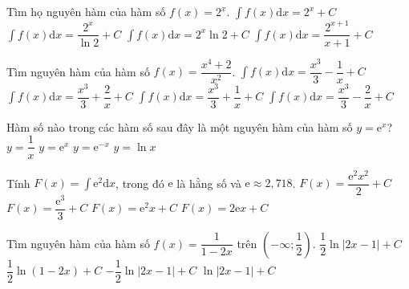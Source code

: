 \begin{ex}
	Tìm họ nguyên hàm của hàm số $ f(x)=2^x$.
	\choice
	{$\displaystyle\int{f(x)}\mathrm{d}x=2^x+C$}
	{\True $\displaystyle\int{f(x)}\mathrm{d}x=\dfrac{2^x}{\ln 2}+C$}
	{$\displaystyle\int{f(x)}\mathrm{d}x=2^x\ln 2+C$}
	{$\displaystyle\int{f(x)}\mathrm{d}x=\dfrac{2^{x+1}}{x+1}+C$}
\end{ex}
\begin{ex}
	Tìm nguyên hàm của hàm số $ f(x)=\dfrac{x^4+2}{x^2}$.
	\choice
	{$\displaystyle\int{f(x)\mathrm{d}x=}\dfrac{x^3}{3}-\dfrac{1}{x}+C$}
	{$\displaystyle\int{f(x)\mathrm{d}x=}\dfrac{x^3}{3}+\dfrac{2}{x}+C$}
	{$\displaystyle\int{f(x)\mathrm{d}x=}\dfrac{x^3}{3}+\dfrac{1}{x}+C$}
	{\True $\displaystyle\int{f(x)\mathrm{d}x=}\dfrac{x^3}{3}-\dfrac{2}{x}+C$}
\end{ex}
\begin{ex}
	[Sở Hà Nội 2019]%
	Hàm số nào trong các hàm số sau đây là một nguyên hàm của hàm số $ y=\mathrm{e}^x$?
	\choice
	{$ y=\dfrac{1}{x}$}
	{\True $ y=\mathrm{e}^x$}
	{$ y=\mathrm{e}^{-x}$}
	{$ y=\ln x$}
\end{ex}
\begin{ex}
	Tính $ F(x)=\displaystyle\int{\mathrm{e}^2}\mathrm{d}x$, trong đó $ \mathrm{e}$ là hằng số và $ \mathrm{e}\approx 2,718$.
	\choice
	{$ F(x)=\dfrac{\mathrm{e}^2x^2}{2}+C$}
	{$ F(x)=\dfrac{\mathrm{e}^3}{3}+C$}
	{\True $ F(x)=\mathrm{e}^2x+C$}
	{$F(x)=2\mathrm{e}x+C$}
\end{ex}
\begin{ex}
	Tìm nguyên hàm của hàm số $ f(x)=\dfrac{1}{1-2x}$ trên $\left(-\infty;\dfrac{1}{2}\right)$.
	\choice
	{$\dfrac{1}{2}\ln \left| 2x-1\right|+C$}
	{$\dfrac{1}{2}\ln \left(1-2x\right)+C$}
	{\True $-\dfrac{1}{2}\ln \left| 2x-1\right|+C$}
	{$\ln \left| 2x-1\right|+C$}
\end{ex}
